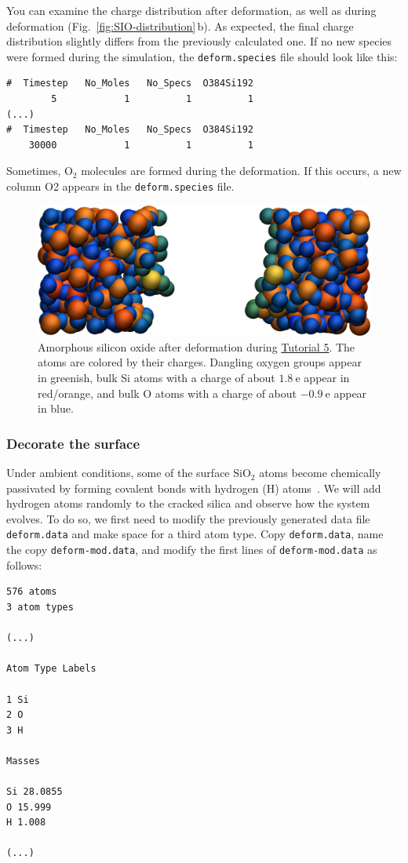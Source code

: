 \documentclass[9pt,tutorial]{livecoms}
\newcommand{\lmpcmd}[1]{\colorbox{listing}{\textcolor{command}{\small{#1}}}} %
\newcommand{\flecmd}[1]{\textcolor{command}{\texttt{#1}}} %
\begin{document}
You can examine the charge distribution after deformation, as well as during
deformation (Fig.~\ref{fig:SIO-distribution}\,b).  As expected, the final
charge distribution slightly differs from the previously calculated one.  If
no new species were formed during the simulation, the \flecmd{deform.species} file
should look like this:
\begin{lstlisting}
#  Timestep   No_Moles   No_Specs  O384Si192
        5            1          1          1
(...)
#  Timestep   No_Moles   No_Specs  O384Si192
    30000            1          1          1
\end{lstlisting}
Sometimes, $\text{O}_2$ molecules are formed during the deformation.  If this occurs,
a new column \lmpcmd{O2} appears in the \flecmd{deform.species} file.

\begin{figure}
\includegraphics[width=\linewidth]{SIO-deformed}
\caption{Amorphous silicon oxide after deformation during
\hyperref[reactive-silicon-dioxide-label]{Tutorial 5}.  The atoms are colored by their
charges.  Dangling oxygen groups appear in greenish, bulk Si atoms with a charge of
about $1.8~\text{e}$  appear in red/orange, and bulk O atoms with a charge of
about $-0.9 ~ \text{e}$ appear in blue.}
\label{fig:SIO-deformed}
\end{figure}

\subsubsection{Decorate the surface}

Under ambient conditions, some of the surface $\text{SiO}_2$ atoms become chemically
passivated by forming covalent bonds with hydrogen (H) atoms~\cite{sulpizi2012silica}.
We will add hydrogen atoms randomly to the cracked silica and observe how the
system evolves.  To do so, we first need to modify the previously generated data
file \flecmd{deform.data} and make space for a third atom type.
Copy \flecmd{deform.data}, name the copy \flecmd{deform-mod.data}, and modify the
first lines of \flecmd{deform-mod.data} as follows:
\begin{lstlisting}
576 atoms
3 atom types

(...)

Atom Type Labels

1 Si
2 O
3 H

Masses

Si 28.0855
O 15.999
H 1.008

(...)
\end{lstlisting}
\end{document}
